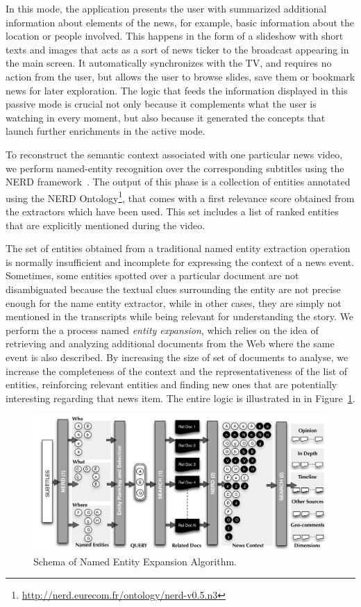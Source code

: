 \documentclass{llncs}
\begin{document}
In this mode, the application presents the user with summarized additional information about elements of the news, for example, basic information about the location or people involved. This happens in the form of a slideshow with short texts and images that acts as a sort of news ticker to the broadcast appearing in the main screen. It automatically synchronizes with the TV, and requires no action from the user, but allows the user to browse slides, save them or bookmark news for later exploration. The logic that feeds the information displayed in this passive mode is crucial not only because it complements what the user is watching in every moment, but also because it generated the concepts that launch further enrichments in the active mode. 

To reconstruct the semantic context associated with one particular news video, we perform named-entity recognition over the corresponding subtitles using the NERD framework~\cite{Rizzo2012b}. The output of this phase is a collection of entities annotated using the NERD Ontology\footnote{\fontsize{8pt}{1em}\selectfont \url{http://nerd.eurecom.fr/ontology/nerd-v0.5.n3}}, that comes with a first relevance score obtained from the extractors which have been used. This set includes a list of ranked entities that are explicitly mentioned during the video.

The set of entities obtained from a traditional named entity extraction operation is normally insufficient and incomplete for expressing the context of a news event. Sometimes, some entities spotted over a particular document are not disambiguated because the textual clues surrounding the entity are not precise enough for the name entity extractor, while in other cases, they are simply not mentioned in the transcripts while being relevant for understanding the story. We perform the a process named \emph{entity expansion}, which relies on the idea of retrieving and analyzing additional documents from the Web where the same event is also described. By increasing the size of set of documents to analyse, we increase the completeness of the context and the representativeness of the list of entities, reinforcing relevant entities and finding new ones that are potentially interesting regarding that news item. The entire logic is illustrated in in Figure~\ref{fig:namedEntityExpansion}.

\begin{figure}[t!]
\centering
\includegraphics[width=1\textwidth]{figure/ExpansionDiagram}
\caption{Schema of Named Entity Expansion Algorithm.}
\label{fig:namedEntityExpansion}%
\end{figure}
\end{document}

